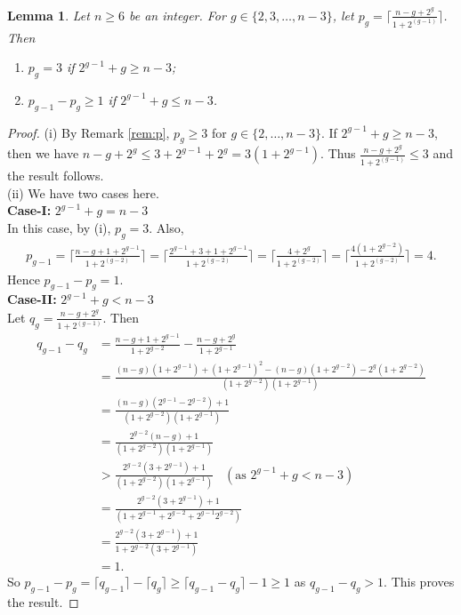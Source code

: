 \documentclass[11pt]{article}
\newtheorem{lemma}[theorem]{Lemma}
\begin{document}
\begin{lemma}\label{lem:cc1}
Let $n\geq 6$ be an integer. For $g\in \{2,3,\ldots,n-3\}$, let $p_g=\lceil \frac{n-g+2^g}{1+2^{(g-1)}} \rceil$. Then
\begin{enumerate}
\item[(i)] $p_g=3$ if  $2^{g-1}+g\geq n-3$;
\item[(ii)] $p_{g-1}- p_{g}\geq 1$ if  $2^{g-1}+g\leq n-3$.
\end{enumerate}
\end{lemma}
\begin{proof}
(i) By Remark \ref{rem:p}, $p_g\geq 3$ for $g\in \{2,\ldots,n-3\}$. If $2^{g-1}+g\geq n-3$, then we have $n-g+2^g\leq 3+2^{g-1}+2^g=3(1+2^{g-1})$. Thus $\frac{n-g+2^g}{1+2^{(g-1)}} \leq 3$ and the result follows.\\

(ii) We have two cases here.\\
\textbf{Case-I:}  $2^{g-1}+g= n-3$\\
In this case, by (i),  $p_g=3$. Also, 
\begin{align*}
 p_{g-1}=\lceil \frac{n-g+1+2^{g-1}}{1+2^{(g-2)}} \rceil=\lceil \frac{2^{g-1}+3+1+2^{g-1}}{1+2^{(g-2)}} \rceil=\lceil \frac{4+2^{g}}{1+2^{(g-2)}}\rceil=\lceil \frac{4(1+2^{g-2})}{1+2^{(g-2)}} \rceil=4.
\end{align*}
Hence $p_{g-1}-p_{g}=1$.\\

\textbf{Case-II:} $2^{g-1}+g< n-3$ \\
Let $q_g=\frac{n-g+2^g}{1+2^{(g-1)}}$. Then 
\begin{align*}
 q_{g-1}-q_g&= \frac{n-g+1+2^{g-1}}{1+2^{g-2}}-\frac{n-g+2^g}{1+2^{g-1}}\\
            &=\frac{(n-g)(1+2^{g-1})+(1+2^{g-1})^2-(n-g)(1+2^{g-2})-2^g(1+2^{g-2})}{(1+2^{g-2})(1+2^{g-1})}\\
            &=\frac{(n-g)(2^{g-1}-2^{g-2})+1}{(1+2^{g-2})(1+2^{g-1})}\\
            &=\frac{2^{g-2}(n-g)+1}{(1+2^{g-2})(1+2^{g-1})}\\
            &>\frac{2^{g-2}(3+2^{g-1})+1}{(1+2^{g-2})(1+2^{g-1})}\;\;\;(\mbox{as $2^{g-1}+g< n-3$})\\
            &=\frac{2^{g-2}(3+2^{g-1})+1}{(1+2^{g-1}+2^{g-2}+2^{g-1}2^{g-2})}\\
            &=\frac{2^{g-2}(3+2^{g-1})+1}{1+2^{g-2}(3+2^{g-1})}\\
            &=1.
\end{align*}
So $p_{g-1}-p_{g}=\lceil q_{g-1} \rceil-\lceil q_g \rceil \geq \lceil q_{g-1}-q_{g}\rceil-1\geq 1$ as $q_{g-1}-q_g > 1$. This proves the result.
\end{proof}
\end{document}
